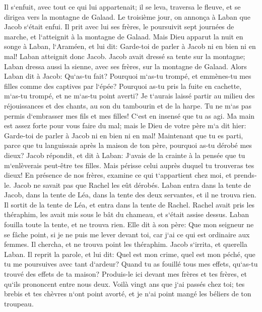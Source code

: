 \verse Il s`enfuit, avec tout ce qui lui appartenait; il se leva, traversa le fleuve, et se dirigea vers la montagne de Galaad. 
\verse Le troisième jour, on annonça à Laban que Jacob s`était enfui. 
\verse Il prit avec lui ses frères, le poursuivit sept journées de marche, et l`atteignit à la montagne de Galaad. 
\verse Mais Dieu apparut la nuit en songe à Laban, l`Araméen, et lui dit: Garde-toi de parler à Jacob ni en bien ni en mal! 
\verse Laban atteignit donc Jacob. Jacob avait dressé sa tente sur la montagne; Laban dressa aussi la sienne, avec ses frères, sur la montagne de Galaad. 
\verse Alors Laban dit à Jacob: Qu`as-tu fait? Pourquoi m`as-tu trompé, et emmènes-tu mes filles comme des captives par l`épée? 
\verse Pourquoi as-tu pris la fuite en cachette, m`as-tu trompé, et ne m`as-tu point averti? Je t`aurais laissé partir au milieu des réjouissances et des chants, au son du tambourin et de la harpe. 
\verse Tu ne m`as pas permis d`embrasser mes fils et mes filles! C`est en insensé que tu as agi. 
\verse Ma main est assez forte pour vous faire du mal; mais le Dieu de votre père m`a dit hier: Garde-toi de parler à Jacob ni en bien ni en mal! 
\verse Maintenant que tu es parti, parce que tu languissais après la maison de ton père, pourquoi as-tu dérobé mes dieux? 
\verse Jacob répondit, et dit à Laban: J`avais de la crainte à la pensée que tu m`enlèverais peut-être tes filles. 
\verse Mais périsse celui auprès duquel tu trouveras tes dieux! En présence de nos frères, examine ce qui t`appartient chez moi, et prends-le. Jacob ne savait pas que Rachel les eût dérobés. 
\verse Laban entra dans la tente de Jacob, dans la tente de Léa, dans la tente des deux servantes, et il ne trouva rien. Il sortit de la tente de Léa, et entra dans la tente de Rachel. 
\verse Rachel avait pris les théraphim, les avait mis sous le bât du chameau, et s`était assise dessus. Laban fouilla toute la tente, et ne trouva rien. 
\verse Elle dit à son père: Que mon seigneur ne se fâche point, si je ne puis me lever devant toi, car j`ai ce qui est ordinaire aux femmes. Il chercha, et ne trouva point les théraphim. 
\verse Jacob s`irrita, et querella Laban. Il reprit la parole, et lui dit: Quel est mon crime, quel est mon péché, que tu me poursuives avec tant d`ardeur? 
\verse Quand tu as fouillé tous mes effets, qu`as-tu trouvé des effets de ta maison? Produis-le ici devant mes frères et tes frères, et qu`ils prononcent entre nous deux. 
\verse Voilà vingt ans que j`ai passés chez toi; tes brebis et tes chèvres n`ont point avorté, et je n`ai point mangé les béliers de ton troupeau. 
